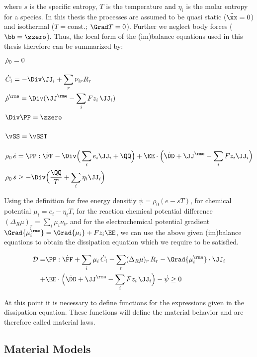 where $s$ is the specific entropy, $T$ is the temperature and $\eta_i$ is the molar entropy for a species. In this thesis the processes are assumed to be quasi static ($\ddot\xx=0$) and isothermal ($T=\text{const.}$; $\Grad T = 0$). Further we neglect body forces ($\bb=\zzero$). Thus, the local form of the (im)balance equations used in this thesis therefore can be summarized by:
\begin{align}
  \vphantom{\sum_i}& \dot\rho_0 = 0 \\
  \vphantom{\sum_i}& \dot C_i = -\Div\JJ_i + \sum_r \nu_{ir} R_r \\
  \vphantom{\sum_i}& \dot \rho^{\rme} = \Div(\JJ^\rme - \sum_i Fz_i\, \JJ_i) \\
  \vphantom{\sum_i}& \Div\PP = \zzero \\
  \vphantom{\sum_i}& \vSS = \vSST \\
  \vphantom{\sum_i}& \rho_0\,\dot e = \PP:\dot\FF - \Div\Big(\sum_i e_i \JJ_i+ \QQ \Big)+ \EE\cdot\Big(\dot \DD+\JJ^\rme-\sum_i Fz_i\JJ_i\Big) \\
  \vphantom{\sum_i}& \rho_0\,\dot s \geq -\Div\Big(\frac{\QQ}{T}+\sum_i \eta_i \JJ_i \Big)
\end{align}

Using the definition for free energy densitiy $\psi=\rho_0(e-sT)$, for chemical potential $\mu_i=e_i-\eta_iT$, for the reaction chemical potential difference $(\Delta_R\mu)_r=\sum_i \mu_i\nu_{ir}$ and for the electrochemical potential gradient $\Grad{\mu^\rme_i}=\Grad{\mu_i} + Fz_i\EE$, we can use the above given (im)balance equations to obtain the dissipation equation which we require to be satisfied. 

\begin{align}
  \begin{aligned}
    \mathcal{D} = &\PP:\dot\FF + \sum_i \mu_i\,\dot C_i - \sum_r (\Delta_R\mu)_r \,R_r - \Grad{\mu_i^\rme}\cdot\JJ_i  \\
                + &\EE\cdot\Big(\dot\DD+\JJ^\rme-\sum_i Fz_i\,\JJ_i\Big)- \dot\psi\geq 0
  \end{aligned}
  \label{eq:dissipation}
\end{align}

At this point it is necessary to define functions for the expressions given in the dissipation equation. These functions will define the material behavior and are therefore called material laws. 

\subsection{Material Models}
